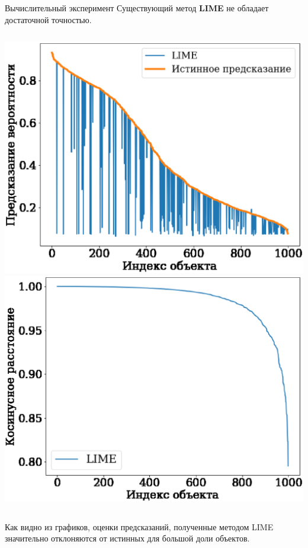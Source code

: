 \documentclass{beamer}
\begin{document}
\begin{frame}{Вычислительный эксперимент}
Существующий метод \textbf{LIME} не обладает достаточной точностью.

\begin{columns}[c]
\includegraphics[width=\textwidth]{../figures/lime_proba_est.eps}
\includegraphics[width=\textwidth]{../figures/lime_cosine.eps}
\end{columns}

Как видно из графиков, оценки предсказаний, полученные методом LIME значительно отклоняются от истинных для большой доли объектов.

\end{frame}
\end{document}
